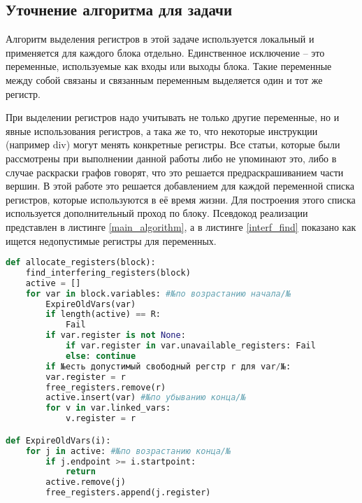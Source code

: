 \documentclass[a4paper,14pt]{extarticle}
\begin{document}

\subsection{Уточнение алгоритма для задачи}

Алгоритм выделения регистров в этой задаче используется локальный и применяется для каждого блока отдельно.
Единственное исключение -- это переменные, используемые как входы или выходы блока.
Такие переменные между собой связаны и связанным переменным выделяется один и тот же регистр.

При выделении регистров надо учитывать не только другие переменные, но и явные использования регистров, а така же то, что некоторые инструкции (например div) могут менять конкретные регистры.
Все статьи, которые были рассмотрены при выполнении данной работы либо не упоминают это, либо в случае раскраски графов говорят, что это решается предраскрашиванием части вершин.
В этой работе это решается добавлением для каждой переменной списка регистров, которые используются в её время жизни.
Для построения этого списка используется дополнительный проход по блоку.
Псевдокод реализации представлен в листинге \ref{main_algorithm}, а в листинге \ref{interf_find} показано как ищется недопустимые регистры для переменных.

\begin{lstlisting}[caption={Алгоритм, использованный в решении}, label=main_algorithm, float, language=Python, basicstyle=\fontsize{11}{13}]
def allocate_registers(block):
    find_interfering_registers(block)
    active = []
    for var in block.variables: #№по возрастанию начала/№
        ExpireOldVars(var)
        if length(active) == R:
            Fail
        if var.register is not None:
            if var.register in var.unavailable_registers: Fail
            else: continue
        if №есть допустимый свободный регстр r для var/№:
        var.register = r
        free_registers.remove(r)
        active.insert(var) #№по убыванию конца/№
        for v in var.linked_vars:
            v.register = r

def ExpireOldVars(i):
    for j in active: #№по возрастанию конца/№
        if j.endpoint >= i.startpoint:
            return
        active.remove(j) 
        free_registers.append(j.register)

\end{lstlisting}
\end{document}
